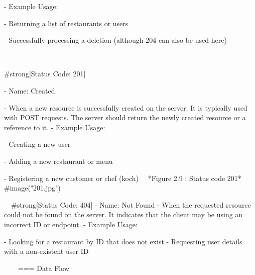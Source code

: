 - Example Usage:

    - Returning a list of restaurants or users

    - Successfully processing a deletion (although 204 can also be used here)
    
  \
  \
  
#strong[Status Code: 201]

- Name: Created

- When a new resource is successfully created on the server. It is typically used with POST requests. The server should return the newly created resource or a reference to it.
- Example Usage:

    - Creating a new user

    - Adding a new restaurant or menu

    - Registering a new customer or chef (koch)
 \ 
 \
*Figure 2.9 : Status code 201*
#image("201.jpg")
    
\
\
#strong[Status Code: 404]
- Name: Not Found
- When the requested resource could not be found on the server. It indicates that the client may be using an incorrect ID or endpoint.
- Example Usage:

    - Looking for a restaurant by ID that does not exist
    - Requesting user details with a non-existent user ID

  \
\
\
\
=== Data Flow
\


